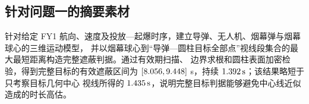 \subsection{针对问题一的摘要素材}

针对给定 FY1 航向、速度及投放—起爆时序，建立导弹、无人机、烟幕弹与烟幕球心的三维运动模型，
并以烟幕球心到“导弹—圆柱目标全部点”视线段集合的最大最短距离构造完整遮蔽判据。通过有效期扫描、
边界求根和圆柱表面加密检验，得到完整目标的有效遮蔽区间为
$[8.056,9.448]$ s，持续 $1.392\,\mathrm s$；该结果略短于只考察目标几何中心
视线所得的 $1.435\,\mathrm s$，说明完整目标判据能够避免中心线近似造成的时长高估。
